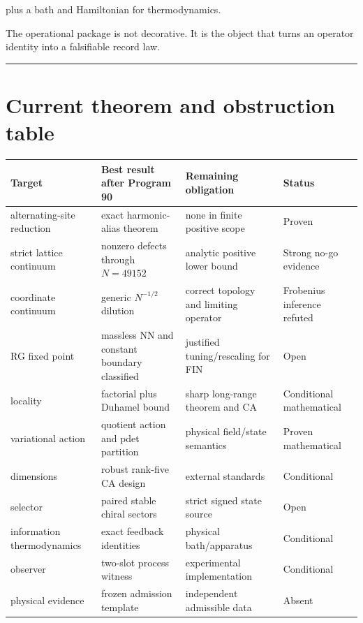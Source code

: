 \documentclass[11pt,a4paper,openany]{report}
\begin{document}
plus a bath and Hamiltonian for thermodynamics.

The operational package is not decorative. It is the object that turns an operator identity into a falsifiable record law.

\par\medskip\hrule\medskip

\chapter{Current theorem and obstruction table}

\begin{center}
\begingroup\small
\setlength{\tabcolsep}{3.5pt}
\renewcommand{\arraystretch}{1.16}
\begin{longtable}{@{}p{}p{}p{}p{}@{}}
\toprule
\textbf{Target} & \textbf{Best result after Program 90} & \textbf{Remaining obligation} & \textbf{Status} \\
\midrule
\endhead
alternating-site reduction & exact harmonic-alias theorem & none in finite positive scope & Proven \\
strict lattice continuum & nonzero defects through \(N=49152\) & analytic positive lower bound & Strong no-go evidence \\
coordinate continuum & generic \(N^{-1/2}\) dilution & correct topology and limiting operator & Frobenius inference refuted \\
RG fixed point & massless NN and constant boundary classified & justified tuning/\allowbreak{}rescaling for FIN & Open \\
locality & factorial plus Duhamel bound & sharp long-range theorem and CA & Conditional mathematical \\
variational action & quotient action and pdet partition & physical field/\allowbreak{}state semantics & Proven mathematical \\
dimensions & robust rank-five CA design & external standards & Conditional \\
selector & paired stable chiral sectors & strict signed state source & Open \\
information thermodynamics & exact feedback identities & physical bath/\allowbreak{}apparatus & Conditional \\
observer & two-slot process witness & experimental implementation & Conditional \\
physical evidence & frozen admission template & independent admissible data & Absent \\
\bottomrule
\end{longtable}
\endgroup
\end{center}
\end{document}

